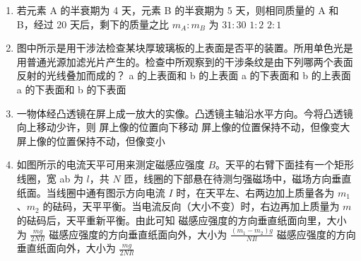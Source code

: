 \documentclass[\gkver]{gaokaozhenti}
\begin{document}
\begin{enumerate}

\item
若元素 A 的半衰期为 4 天，元素 B 的半衰期为 5 天，则相同质量的 A 和 B，经过 20 天后，剩下的质量之比 $m_{A}:m_{B}$ 为
{$31:30$}
{$1:2$}
{$2:1$}


\item
图中所示是用干涉法检查某块厚玻璃板的上表面是否平的装置。所用单色光是用普通光源加滤光片产生的。检查中所观察到的干涉条纹是由下列哪两个表面反射的光线叠加而成的？
\onepicture[w=5.5cm]{}
{a 的上表面和 b 的上表面}
{a 的下表面和 b 的上表面}
{a 的下表面和 b 的下表面}


\item
一物体经凸透镜在屏上成一放大的实像。凸透镜主轴沿水平方向。今将凸透镜向上移动少许，则
{屏上像的位置向下移动}
{屏上像的位置保持不动，但像变大}
{屏上像的位置保持不动，但像变小}


\item
如图所示的电流天平可用来测定磁感应强度 $B$。天平的右臂下面挂有一个矩形线圈，宽 ab 为 $l$，共 $N$ 匝，线圈的下部悬在待测匀强磁场中，磁场方向垂直纸面。当线圈中通有图示方向电流 $I$ 时，在天平左、右两边加上质量各为 $m_{1}$、$m_{2}$ 的砝码，天平平衡。当电流反向（大小不变）时，右边再加上质量为 $m$ 的砝码后，天平重新平衡。由此可知
{磁感应强度的方向垂直纸面向里，大小为 $\frac{mg}{2NIl}$}
{磁感应强度的方向垂直纸面向外，大小为 $\frac{(m_{1}-m_{2})g}{NIl}$}
{磁感应强度的方向垂直纸面向外，大小为 $\frac{mg}{2NIl}$}


\end{enumerate}
\end{document}
